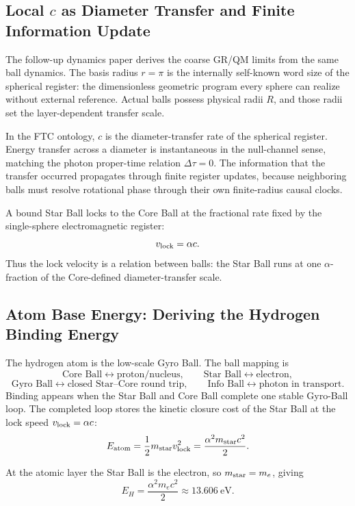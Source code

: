 \documentclass[11pt,a4paper]{article}
\begin{document}
\subsection{Local \(c\) as Diameter Transfer and Finite Information Update}

The follow-up dynamics paper derives the coarse GR/QM limits from the same ball dynamics. The basis radius \(r=\pi\) is the internally self-known word size of the spherical register: the dimensionless geometric program every sphere can realize without external reference. Actual balls possess physical radii \(R\), and those radii set the layer-dependent transfer scale.

In the FTC ontology, \(c\) is the diameter-transfer rate of the spherical register. Energy transfer across a diameter is instantaneous in the null-channel sense, matching the photon proper-time relation \(\Delta\tau=0\). The information that the transfer occurred propagates through finite register updates, because neighboring balls must resolve rotational phase through their own finite-radius causal clocks.

A bound Star Ball locks to the Core Ball at the fractional rate fixed by the single-sphere electromagnetic register:
\[
v_{\rm lock}=\alpha c.
\]
Thus the lock velocity is a relation between balls: the Star Ball runs at one \(\alpha\)-fraction of the Core-defined diameter-transfer scale.

\subsection{Atom Base Energy: Deriving the Hydrogen Binding Energy}

The hydrogen atom is the low-scale Gyro Ball. The ball mapping is
\[
\text{Core Ball} \leftrightarrow \text{proton/nucleus},
\qquad
\text{Star Ball} \leftrightarrow \text{electron},
\]
\[
\text{Gyro Ball} \leftrightarrow \text{closed Star--Core round trip},
\qquad
\text{Info Ball} \leftrightarrow \text{photon in transport}.
\]
Binding appears when the Star Ball and Core Ball complete one stable Gyro-Ball loop. The completed loop stores the kinetic closure cost of the Star Ball at the lock speed \(v_{\rm lock}=\alpha c\):
\begin{equation}
E_{\rm atom}
=
\frac12 m_{\rm star}v_{\rm lock}^2
=
\frac{\alpha^2 m_{\rm star} c^2}{2}.
\label{eq:atom_base}
\end{equation}

At the atomic layer the Star Ball is the electron, so \(m_{\rm star}=m_e\), giving
\[
E_H = \frac{\alpha^2 m_e c^2}{2} \approx 13.606\ \text{eV}.
\]
\end{document}
